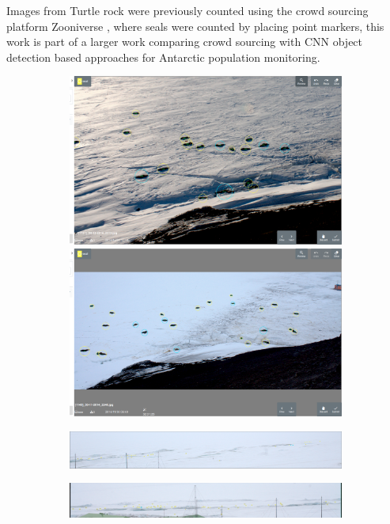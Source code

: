Images from Turtle rock were previously counted using the crowd sourcing platform Zooniverse \cite{Zooniverse}, where seals were counted by placing point markers, this work is part of a larger work comparing crowd sourcing with \gls{CNN} object detection based approaches for Antarctic population monitoring.

\begin{figure}[h!]
\centering
\begin{subfigure}[t]{1.0\linewidth}
  \includegraphics[width=0.475\linewidth]{figures/annotation/screenshots/seals_small2.png}
  \hfill
  \includegraphics[width=0.475\linewidth]{figures/annotation/screenshots/seals_small.png}
  \caption{}
\end{subfigure}

\begin{subfigure}[t]{1.0\linewidth}
  \includegraphics[width=1.0\linewidth]{figures/annotation/screenshots/cam_c.png}
\end{subfigure}

\begin{subfigure}[t]{1.0\linewidth}
  \includegraphics[width=1.0\linewidth]{figures/annotation/screenshots/cam_b.png}
  \caption{}
\end{subfigure}


\end{figure}
